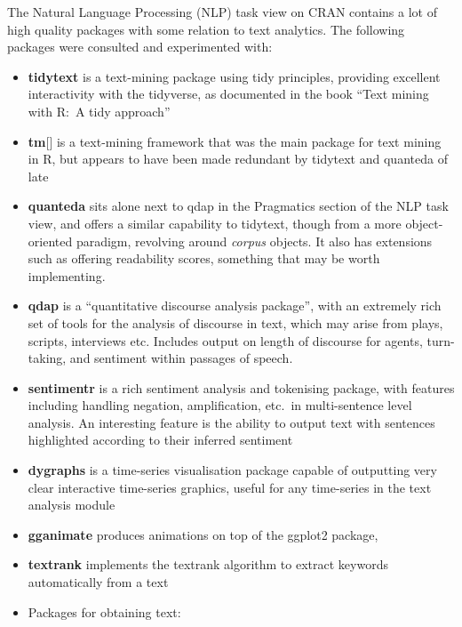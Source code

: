 \documentclass[11pt, a4paper, twoside, titlepage]{report}
\begin{document}
The Natural Language Processing (NLP) task view on CRAN contains a lot
of high quality packages with some relation to text
analytics\autocite{wild:_cran_task_view}. The following packages were
consulted and experimented with:

\begin{itemize}
\item \textbf{tidytext}\autocite{Silge2016tidytext} is a text-mining
  package using tidy principles, providing excellent interactivity
  with the tidyverse, as documented in the book ``Text mining with
  R:~A tidy approach''\autocite{silge2017text}
\item \textbf{tm}[\autocite{feinerer18}] is a text-mining framework that was the main package
  for text mining in R, but appears to have been made redundant by
  tidytext and quanteda of late
\item \textbf{quanteda}\autocite{benoit18} sits alone next to qdap in the Pragmatics
  section of the NLP task view, and offers a similar capability to
  tidytext, though from a more object-oriented paradigm, revolving
  around \textit{corpus} objects. It also has extensions such as
  offering readability scores, something that may be worth
  implementing.
\item \textbf{qdap}\autocite{rinker19qdap} is a ``quantitative discourse analysis package'',
  with an extremely rich set of tools for the analysis of discourse in
  text, which may arise from plays, scripts, interviews etc.
  Includes output on length of discourse for agents, turn-taking, and
  sentiment within passages of speech.
\item \textbf{sentimentr}\autocite{rinker19sent} is a rich sentiment analysis and tokenising
  package, with features including handling negation, amplification,
  etc.\ in multi-sentence level analysis. An interesting feature is
  the ability to output text with sentences highlighted according to
  their inferred sentiment
\item \textbf{dygraphs}\autocite{vanderkam18} is a time-series visualisation package capable
  of outputting very clear interactive time-series graphics, useful
  for any time-series in the text analysis module
\item \textbf{gganimate}\autocite{pedersen19} produces animations on top of the ggplot2
  package,
\item \textbf{textrank}\autocite{wijffels19} implements the textrank algorithm to extract
  keywords automatically from a text
\item Packages for obtaining text:

\end{itemize}
\end{document}
